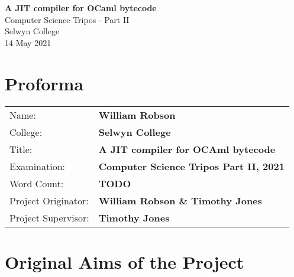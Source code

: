 
\newcommand{\thedate}{14 May 2021}

\begin{titlepage}


    \vspace*{60mm}

    \begin{center}
        \Huge
        \textbf{A JIT compiler for OCaml bytecode} \\[5mm]
        \Large
        Computer Science Tripos - Part II \\[5mm]
        Selwyn College \\[5mm]
        \thedate
    \end{center}

    \cleardoublepage

\end{titlepage}


\section*{Proforma}

 {\large

  \begin{tabular}{ll}
      Name:               & \textbf{William Robson}                        \\
      College:            & \textbf{Selwyn College}                        \\
      Title:              & \textbf{A JIT compiler for OCAml bytecode}     \\
      Examination:        & \textbf{Computer Science Tripos Part II, 2021} \\
      Word Count:         & \textbf{TODO}                                  \\
      Project Originator: & \textbf{William Robson \& Timothy Jones}       \\
      Project Supervisor: & \textbf{Timothy Jones}                         \\
  \end{tabular}
 }

\section*{Original Aims of the Project}

